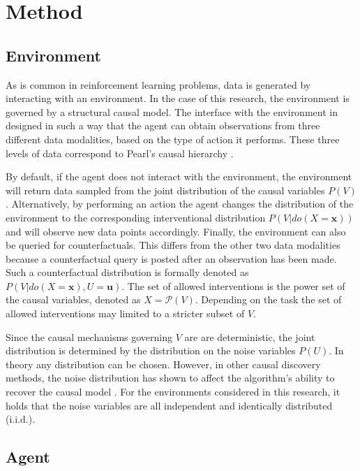 \documentclass{article}
\begin{document}
\section{Method}

\subsection{Environment}

As is common in reinforcement learning problems, data is generated by interacting with an environment. In the case of this research, the environment is governed by a structural causal model. The interface with the environment in designed in such a way that the agent can obtain observations from three different data modalities, based on the type of action it performs. These three levels of data correspond to Pearl's causal hierarchy \cite{pearl2009causality}.

By default, if the agent does not interact with the environment, the environment will return data sampled from the joint distribution of the causal variables $P(V)$. Alternatively, by performing an action the agent changes the distribution of the environment to the corresponding interventional distribution $P(V|do(X=\mathbf{x}))$ and will observe new data points accordingly. Finally, the environment can also be queried for counterfactuals. This differs from the other two data modalities because a counterfactual query is posted after an observation has been made. Such a counterfactual distribution is formally denoted as $P(V|do(X=\mathbf{x}), U=\mathbf{u})$. The set of allowed interventions is the power set of the causal variables, denoted as $X = \mathcal{P}(V)$. Depending on the task the set of allowed interventions may limited to a stricter subset of $V$.

Since the causal mechanisms governing $V$ are are deterministic, the joint distribution is determined by the distribution on the noise variables $P(U)$. In theory any distribution can be chosen. However, in other causal discovery methods, the noise distribution has shown to affect the algorithm's ability to recover the causal model \cite{TODO}. For the environments considered in this research, it holds that the noise variables are all independent and identically distributed (i.i.d.).

\subsection{Agent}
\end{document}

